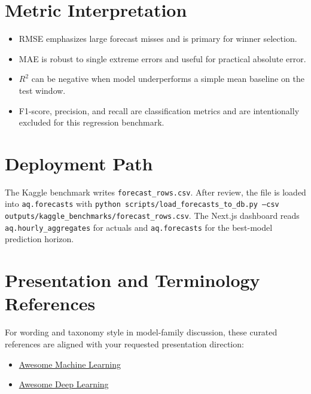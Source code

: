\documentclass[11pt,a4paper,oneside]{book}
\begin{document}
\chapter{Metric Interpretation}
\begin{itemize}
  \item RMSE emphasizes large forecast misses and is primary for winner selection.
  \item MAE is robust to single extreme errors and useful for practical absolute error.
  \item $R^2$ can be negative when model underperforms a simple mean baseline on the test window.
  \item F1-score, precision, and recall are classification metrics and are intentionally excluded for this regression benchmark.
\end{itemize}

\chapter{Deployment Path}
The Kaggle benchmark writes \texttt{forecast\_rows.csv}. After review, the file is loaded into \texttt{aq.forecasts} with
\texttt{python scripts/load\_forecasts\_to\_db.py --csv outputs/kaggle\_benchmarks/forecast\_rows.csv}.
The Next.js dashboard reads \texttt{aq.hourly\_aggregates} for actuals and \texttt{aq.forecasts} for the best-model prediction horizon.

\chapter{Presentation and Terminology References}
For wording and taxonomy style in model-family discussion, these curated references are aligned with your requested presentation direction:
\begin{itemize}
  \item \href{https://github.com/josephmisiti/awesome-machine-learning}{Awesome Machine Learning}
  \item \href{https://github.com/ChristosChristofidis/awesome-deep-learning}{Awesome Deep Learning}
\end{itemize}
\end{document}
